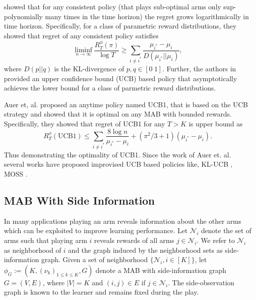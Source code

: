 \documentclass{article}
\begin{document}
\cite{AAM85_Asymptotically_LaiRobbins} showed that for any consistent policy (that plays sub-optimal arms only sup-polynomially many times in the time horizon) the regret grows logarithmically in time horizon. Specifically, for a class of parametric reward distributions, they showed that regret of any consistent policy satisfies
\begin{equation}
\label{eqn:MABLowerBound}
\liminf_{n \rightarrow \infty}\frac{ R^\phi_T(\pi)}{\log T} \geq \sum_{i\neq i^*} \frac{\mu_{i^*}-\mu_i}{D(\mu_{i^*}||\mu_i)},
\end{equation}
where  $D(p||q)$ is the KL-divergence of $p,q \in [0\; 1]$. Further, the authors in \cite{AAM85_Asymptotically_LaiRobbins}  provided an upper confidence bound (UCB) based policy that asymptotically achieves the lower bound for a class of parmetric reward distributions.
 
Auer et, al. \cite{ML02_FiniteTimeAnalysis_AuerBianchiFischer} proposed an anytime policy named UCB1, that is based on the UCB strategy and showed that it is optimal on any MAB with bounded rewards. Specifically, they showed that regret of UCB1 for any $T>K$ is upper bound as 
\begin{equation}
\label{eqn:UCB1UpperBound}
R^\phi_T(\mbox{UCB1})\leq \sum_{i\neq i^*} \frac{8\log n}{\mu_{i^*}-\mu_i} + (\pi^2/3 + 1)(\mu_{i^*}-\mu_i).
\end{equation}
Thus demonstrating the optimality of UCB1. Since the work of Auer et. al. several works have proposed improvised UCB based policies like, KL-UCB \cite{COLT11_TheKL-UCBAlgorithm_GarivierCappe}, MOSS \cite{JMLR2010_RegretBoundsAndMinimax_AudibertBubeck}.


\subsection{MAB With Side Information}
In many applications playing an arm reveals information about the other arms which can be exploited to improve learning performance. Let $\mathcal{N}_i$  denote the set of arms such that playing arm $i$ reveals rewards of all arms $j \in \mathcal{N}_i$. We refer to $\mathcal{N}_i$ as neighborhood of $i$ and the graph induced by the neighborhood sets as side-information graph. Given a set of neighborhood $\{\mathcal{N}_i, i\in [K]\}$, let $\phi_G:=(K, (\nu_k)_{1\leq k\leq K}, G)$ denote a MAB with side-information graph $G=(V,E)$, where $|V|=K$ and $(i,j)\in E$ if $j \in \mathcal{N}_i$. The side-observation graph is known to the learner and remains fixed during the play. 
\end{document}
